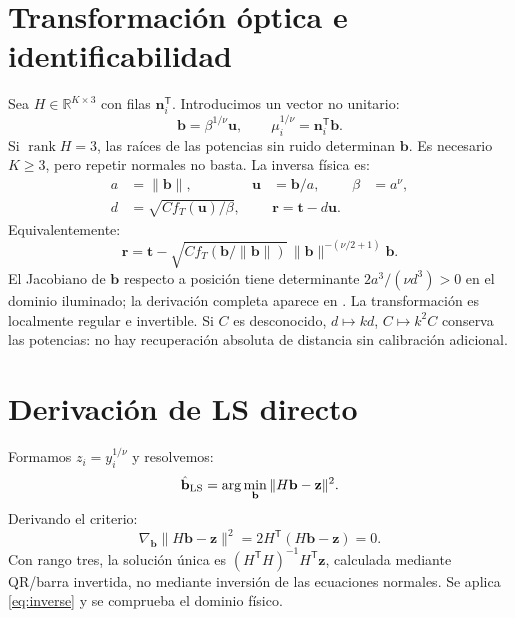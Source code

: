 \documentclass[11pt,a4paper]{article}
\begin{document}
\section{Transformación óptica e identificabilidad}
Sea $H\in\mathbb R^{K\times3}$ con filas $\mathbf n_i^{\mathsf T}$. Introducimos un vector no unitario:
\begin{equation}
 \mathbf b=\beta^{1/\nu}\mathbf u,\qquad \mu_i^{1/\nu}=\mathbf n_i^{\mathsf T}\mathbf b.
\label{eq:optical}
\end{equation}
Si $\operatorname{rank}H=3$, las raíces de las potencias sin ruido determinan $\mathbf b$. Es necesario $K\geq3$, pero repetir normales no basta. La inversa física es:
\begin{align}
 a&=\|\mathbf b\|, & \mathbf u&=\mathbf b/a, & \beta&=a^\nu,\\
 d&=\sqrt{Cf_T(\mathbf u)/\beta}, &&\mathbf r=\mathbf t-d\mathbf u.
\label{eq:inverse}
\end{align}
Equivalentemente:
\begin{equation}
 \mathbf r=\mathbf t-\sqrt{Cf_T(\mathbf b/\|\mathbf b\|)}\,
 \|\mathbf b\|^{-(\nu/2+1)}\mathbf b.
\end{equation}
El Jacobiano de $\mathbf b$ respecto a posición tiene determinante $2a^3/(\nu d^3)>0$ en el dominio iluminado; la derivación completa aparece en . La transformación es localmente regular e invertible. Si $C$ es desconocido, $d\mapsto kd$, $C\mapsto k^2C$ conserva las potencias: no hay recuperación absoluta de distancia sin calibración adicional.

\section{Derivación de LS directo}
Formamos $z_i=y_i^{1/\nu}$ y resolvemos:
\begin{equation}
 \hat{\mathbf b}_{\rm LS}=\arg\min_{\mathbf b}\|H\mathbf b-\mathbf z\|^2.
\end{equation}
Derivando el criterio:
\begin{equation}
 \nabla_{\mathbf b}\|H\mathbf b-\mathbf z\|^2=2H^{\mathsf T}(H\mathbf b-\mathbf z)=0.
\end{equation}
Con rango tres, la solución única es $(H^{\mathsf T}H)^{-1}H^{\mathsf T}\mathbf z$, calculada mediante QR/barra invertida, no mediante inversión de las ecuaciones normales. Se aplica \eqref{eq:inverse} y se comprueba el dominio físico.
\end{document}
